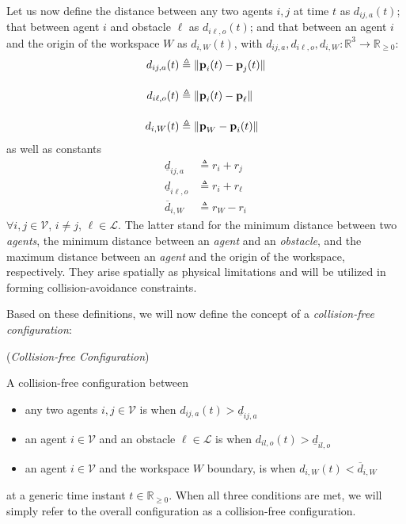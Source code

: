 Let us now define the distance between any two agents $i,j$ at time $t$ as
$d_{ij,a}(t)$; that between agent $i$ and obstacle $\ell$ as $d_{i\ell,o}(t)$;
and that between an agent $i$ and the origin of the workspace $W$ as
$d_{i,W}(t)$, with $d_{ij,a}, d_{i\ell,o}, d_{i,W} : \mathbb{R}^3 \to \mathbb{R}_{\geq 0}$:
\begin{subequations}
	\begin{align}
    d_{ij,a}(t) &\triangleq \| \bm{\mathbf{p}}_i(t) - \bm{\mathbf{p}}_j(t) \| \\[2.5ex]
    d_{i\ell,o}(t) &\triangleq \| \bm{\mathbf{p}}_i(t) - \bm{\mathbf{p}}_\ell \| \\[2.5ex]
    d_{i,W}(t) &\triangleq \| \bm{\mathbf{p}}_W - \bm{\mathbf{p}}_i(t) \|
	\end{align}
\end{subequations}
as well as constants
\begin{subequations}
	\begin{align}
    \underline{d}_{ij, a} &\triangleq r_{i} + r_{j} \\[2.5ex]
    \underline{d}_{i\ell, o} &\triangleq r_{i} + r_{\ell} \\[2.5ex]
    \overline{d}_{i,W} &\triangleq r_W - r_i
	\end{align}
\end{subequations}
$\forall i, j \in \mathcal{V}$, $i \neq j$, $\ell \in \mathcal{L}$.
The latter stand for the minimum distance between two \textit{agents}, the
minimum distance between an \textit{agent} and an \textit{obstacle},
and the maximum distance between an \textit{agent} and the origin of the
workspace, respectively. They arise spatially as physical limitations and will
be utilized in forming collision-avoidance constraints.

Based on these definitions, we will now define the concept of a
\textit{collision-free configuration}:\\

\begin{bw_box}
\begin{definition} (\textit{Collision-free Configuration})
\label{definition:collision_free_conf}

  A collision-free configuration between
  \begin{itemize}
    \item any two agents $i,j \in \mathcal{V}$ is when $d_{ij,a}(t) > \underline{d}_{ij,a}$
    \item an agent $i \in \mathcal{V}$ and an obstacle $\ell \in \mathcal{L}$
     is when $d_{il,o}(t) > \underline{d}_{il,o}$
    \item an agent $i \in \mathcal{V}$ and the workspace $W$ boundary,
     is when $d_{i,W}(t) < \overline{d}_{i,W}$
  \end{itemize}
  at a generic time instant $t \in \mathbb{R}_{\geq 0}$. When all three
  conditions are met, we will simply refer to the overall configuration as
  a collision-free configuration.
\end{definition}
\end{bw_box}
